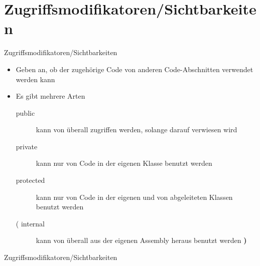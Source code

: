 \section{Zugriffsmodifikatoren/Sichtbarkeiten}
\begin{frame}{Zugriffsmodifikatoren/Sichtbarkeiten}
	\begin{itemize}
		\item Geben an, ob der zugehörige Code von anderen Code-Abschnitten verwendet werden kann
		\item Es gibt mehrere Arten
		\begin{description}
			\item[public] kann von überall zugriffen werden, solange darauf verwiesen wird
			\item[private] kann nur von Code in der eigenen Klasse benutzt werden
			\item[protected] kann nur von Code in der eigenen und von abgeleiteten Klassen benutzt werden
			\item[( internal] kann von überall aus der eigenen Assembly heraus benutzt werden \textbf{)}
		\end{description}
	\end{itemize}
\end{frame}

\begin{frame}{Zugriffsmodifikatoren/Sichtbarkeiten}
	
\end{frame}


